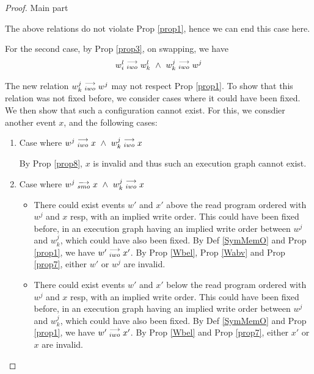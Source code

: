 \begin{proof}{Main part}
\begin{itemize}
                        The above relations do not violate Prop \ref{prop1}, hence we can end this case here. 

                        For the second case, by Prop \ref{prop3}, on swapping, we have 
                        \begin{align*}
                            \reln{w_i^l}{iwo}{w_k^l} \ \wedge \ \reln{w_k^j}{iwo}{w^j}
                        \end{align*}

                        The new relation $w_k^j\stackrel{\longrightarrow}{_{iwo}}w^j$ may not respect Prop \ref{prop1}. 
                        To show that this relation was not fixed before, we consider cases where it could have been fixed. We then show that such a configuration cannot exist. For this, we consdier another event $x$, and the following cases:

                        \begin{enumerate}
                            \item Case where $w^j\stackrel{\longrightarrow}{_{iwo}}x \ \wedge \ w_k^j\stackrel{\longrightarrow}{_{iwo}}x$
                                
                                By Prop \ref{prop8}, $x$ is invalid and thus such an execution graph cannot exist.

                            \item Case where $w^j\stackrel{\longrightarrow}{_{smo}}x \ \wedge \ w_k^j\stackrel{\longrightarrow}{_{iwo}}x$

                                \begin{itemize}
                                
                                    \item There could exist events $w'$ and $x'$ above the read program ordered with $w^j$ and $x$ resp, with an implied write order. This could have been fixed before, in an execution graph having an implied write order between $w^j$ and $w_k^j$, which could have also been fixed.
                                    By Def \ref{SymMemO} and Prop \ref{prop1}, we have $w'\stackrel{\longrightarrow}{_{iwo}}x'$.
                                    By Prop \ref{Wbel}, Prop \ref{Wabv} and Prop \ref{prop7}, either $w'$ or $w^j$ are invalid. 

                                    \item There could exist events $w'$ and $x'$ below the read program ordered with $w^j$ and $x$ resp, with an implied write order. This could have been fixed before, in an execution graph having an implied write order between $w^j$ and $w_k^j$, which could have also been fixed.
                                    By Def \ref{SymMemO} and Prop \ref{prop1}, we have $w'\stackrel{\longrightarrow}{_{iwo}}x'$.
                                    By Prop \ref{Wbel} and Prop \ref{prop7}, either $x'$ or $x$ are invalid. 


\end{itemize}
\end{enumerate}
\end{itemize}
\end{proof}
